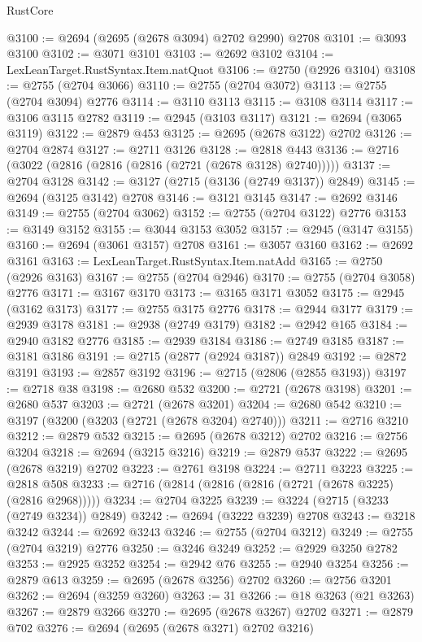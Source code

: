\begin{lexlean}{RustCore}
\begin{coremodule}
@3100 := @2694 (@2695 (@2678 @3094) @2702 @2990) @2708
@3101 := @3093 @3100
@3102 := @3071 @3101
@3103 := @2692 @3102
@3104 := LexLeanTarget.RustSyntax.Item.natQuot
@3106 := @2750 (@2926 @3104)
@3108 := @2755 (@2704 @3066)
@3110 := @2755 (@2704 @3072)
@3113 := @2755 (@2704 @3094) @2776
@3114 := @3110 @3113
@3115 := @3108 @3114
@3117 := @3106 @3115 @2782
@3119 := @2945 (@3103 @3117)
@3121 := @2694 (@3065 @3119)
@3122 := @2879 @453
@3125 := @2695 (@2678 @3122) @2702
@3126 := @2704 @2874
@3127 := @2711 @3126
@3128 := @2818 @443
@3136 := @2716 (@3022 (@2816 (@2816 (@2816 (@2721 (@2678 @3128) @2740)))))
@3137 := @2704 @3128
@3142 := @3127 (@2715 (@3136 (@2749 @3137)) @2849)
@3145 := @2694 (@3125 @3142) @2708
@3146 := @3121 @3145
@3147 := @2692 @3146
@3149 := @2755 (@2704 @3062)
@3152 := @2755 (@2704 @3122) @2776
@3153 := @3149 @3152
@3155 := @3044 @3153 @3052
@3157 := @2945 (@3147 @3155)
@3160 := @2694 (@3061 @3157) @2708
@3161 := @3057 @3160
@3162 := @2692 @3161
@3163 := LexLeanTarget.RustSyntax.Item.natAdd
@3165 := @2750 (@2926 @3163)
@3167 := @2755 (@2704 @2946)
@3170 := @2755 (@2704 @3058) @2776
@3171 := @3167 @3170
@3173 := @3165 @3171 @3052
@3175 := @2945 (@3162 @3173)
@3177 := @2755 @3175 @2776
@3178 := @2944 @3177
@3179 := @2939 @3178
@3181 := @2938 (@2749 @3179)
@3182 := @2942 @165
@3184 := @2940 @3182 @2776
@3185 := @2939 @3184
@3186 := @2749 @3185
@3187 := @3181 @3186
@3191 := @2715 (@2877 (@2924 @3187)) @2849
@3192 := @2872 @3191
@3193 := @2857 @3192
@3196 := @2715 (@2806 (@2855 @3193))
@3197 := @2718 @38
@3198 := @2680 @532
@3200 := @2721 (@2678 @3198)
@3201 := @2680 @537
@3203 := @2721 (@2678 @3201)
@3204 := @2680 @542
@3210 := @3197 (@3200 (@3203 (@2721 (@2678 @3204) @2740)))
@3211 := @2716 @3210
@3212 := @2879 @532
@3215 := @2695 (@2678 @3212) @2702
@3216 := @2756 @3204
@3218 := @2694 (@3215 @3216)
@3219 := @2879 @537
@3222 := @2695 (@2678 @3219) @2702
@3223 := @2761 @3198
@3224 := @2711 @3223
@3225 := @2818 @508
@3233 := @2716 (@2814 (@2816 (@2816 (@2721 (@2678 @3225) (@2816 @2968)))))
@3234 := @2704 @3225
@3239 := @3224 (@2715 (@3233 (@2749 @3234)) @2849)
@3242 := @2694 (@3222 @3239) @2708
@3243 := @3218 @3242
@3244 := @2692 @3243
@3246 := @2755 (@2704 @3212)
@3249 := @2755 (@2704 @3219) @2776
@3250 := @3246 @3249
@3252 := @2929 @3250 @2782
@3253 := @2925 @3252
@3254 := @2942 @76
@3255 := @2940 @3254
@3256 := @2879 @613
@3259 := @2695 (@2678 @3256) @2702
@3260 := @2756 @3201
@3262 := @2694 (@3259 @3260)
@3263 := 31
@3266 := @18 @3263 (@21 @3263)
@3267 := @2879 @3266
@3270 := @2695 (@2678 @3267) @2702
@3271 := @2879 @702
@3276 := @2694 (@2695 (@2678 @3271) @2702 @3216)

\end{coremodule}
\end{lexlean}
